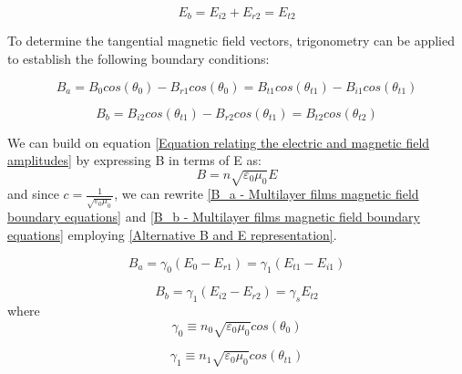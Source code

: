    \begin{equation} \label{E_b - Multilayer films electric field boundary equations}
    E_b = E_{i2} + E_{r2} = E_{t2}
    \end{equation}

To determine the tangential magnetic field vectors, trigonometry can be applied to establish the following boundary conditions:

    \begin{equation} \label{B_a - Multilayer films magnetic field boundary equations}
    B_a = B_0cos(\theta_0) - B_{r1}cos(\theta_0) = B_{t1}cos(\theta_{t1}) - B_{i1}cos(\theta_{t1})
    \end{equation}

    \begin{equation} \label{B_b - Multilayer films magnetic field boundary equations}
    B_b = B_{i2}cos(\theta_{t1}) - B_{r2}cos(\theta_{t1}) = B_{t2}cos(\theta_{t2})
    \end{equation}

We can build on equation \ref{Equation relating the electric and magnetic field amplitudes} by expressing B in terms of E as:
    \begin{equation} \label{Alternative B and E representation}
    B = n\sqrt{\varepsilon_0\mu_0}E
    \end{equation}
and since $c=\frac{1}{\sqrt{\varepsilon_0\mu_0}}$, we can rewrite \ref{B_a - Multilayer films magnetic field boundary equations} and \ref{B_b - Multilayer films magnetic field boundary equations} employing \ref{Alternative B and E representation}.

    \begin{equation} \label{Alternative B_a - Multilayer films magnetic field boundary equations}
    B_a = \gamma_0(E_0 - E_{r1}) = \gamma_1(E_{t1} - E_{i1})
    \end{equation}

    \begin{equation} \label{Alternative B_b - Multilayer films magnetic field boundary equations}
    B_b = \gamma_1(E_{i2} - E_{r2}) = \gamma_sE_{t2}
    \end{equation}
where
    \begin{equation} \label{gamma 0}
        \gamma_0 \equiv n_0 \sqrt{\varepsilon_0\mu_0} cos(\theta_0)
    \end{equation}

    \begin{equation} \label{gamma 1}
        \gamma_1 \equiv n_1 \sqrt{\varepsilon_0\mu_0} cos(\theta_{t1})
    \end{equation}

